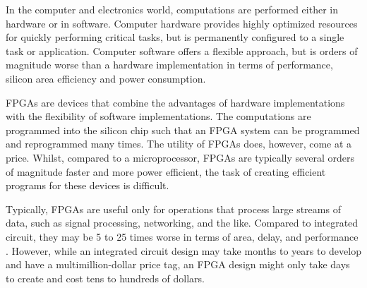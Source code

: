 In the computer and electronics world, computations are performed either in 
hardware or in software. Computer hardware provides highly optimized resources
for quickly performing critical tasks, but is permanently configured to a single
task or application. Computer software offers a flexible approach, but is orders
of magnitude worse than a hardware implementation in terms of performance, 
silicon area efficiency and power consumption.

FPGAs are devices that combine the advantages of hardware implementations with 
the flexibility of software implementations. The computations are programmed 
into the silicon chip such that an FPGA system can be programmed and 
reprogrammed many times. The utility of FPGAs does, however, come at a price. 
Whilst, compared to a microprocessor, FPGAs are typically several orders of 
magnitude faster and more power efficient, the task of creating efficient 
programs for these devices is difficult.

Typically, FPGAs are useful only for operations that process large streams of 
data, such as signal processing, networking, and the like. Compared to 
integrated circuit, they may be 5 to 25 times worse in terms of area, delay, and
performance \cite{Hauck:2007}. However, while an integrated circuit design may 
take months to years to develop and have a multimillion-dollar price tag, an 
FPGA design might only take days to create and cost tens to hundreds of dollars.
